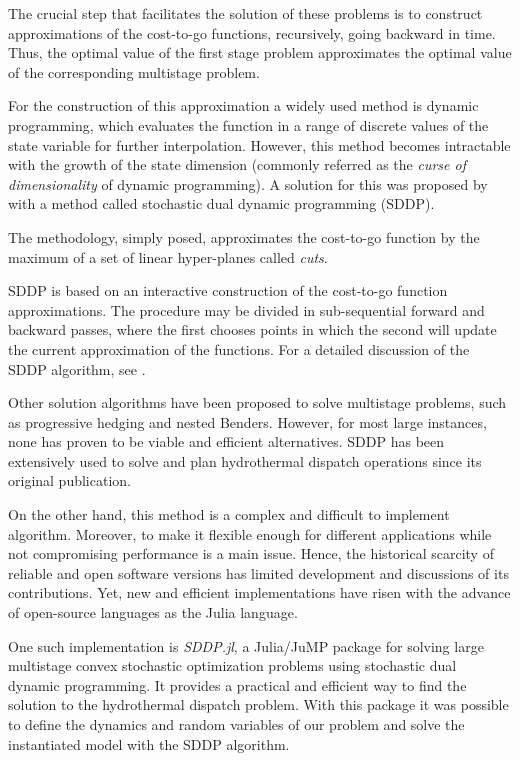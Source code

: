 \documentclass{juliacon}
\begin{document}
The crucial step that facilitates the solution of these problems is to construct approximations of the cost-to-go functions, recursively, going backward in time. Thus, the optimal value of the first stage problem approximates the optimal value of the corresponding multistage problem.

For the construction of this approximation a widely used method is dynamic programming, which evaluates the function in a range of discrete values of the state variable for further interpolation. However, this method becomes intractable with the growth of the state dimension (commonly referred as the \textit{curse of dimensionality} of dynamic programming). A solution for this was proposed by \cite{pereira1991multi} with a method called stochastic dual dynamic programming (SDDP).

The methodology, simply posed, approximates the cost-to-go function by the maximum of a set of linear hyper-planes called \textit{cuts}.

SDDP is based on an interactive construction of the cost-to-go function approximations. The procedure may be divided in sub-sequential forward and backward passes, where the first chooses points in which the second will update the current approximation of the functions. For a detailed discussion of the SDDP algorithm, see \cite{pereira1991multi,dowson_sddp.jl}.

Other solution algorithms have been proposed to solve multistage problems, such as progressive hedging and nested Benders. However, for most large instances, none has proven to be viable and efficient alternatives. SDDP has been extensively used to solve and plan hydrothermal dispatch operations since its original publication.  

On the other hand, this method is a complex and difficult to implement algorithm. Moreover, to make it flexible enough for different applications while not compromising performance is a main issue. Hence, the historical scarcity of reliable and open software versions has limited development and discussions of its contributions. Yet, new and efficient implementations have risen with the advance of open-source languages as the Julia language.  

One such implementation is \textit{SDDP.jl}, a Julia/JuMP package for solving large multistage convex stochastic optimization problems using stochastic dual dynamic programming. It provides a practical and efficient way to find the solution to the hydrothermal dispatch problem. With this package it was possible to define the dynamics and random variables of our problem and solve the instantiated model with the SDDP algorithm.
\end{document}
